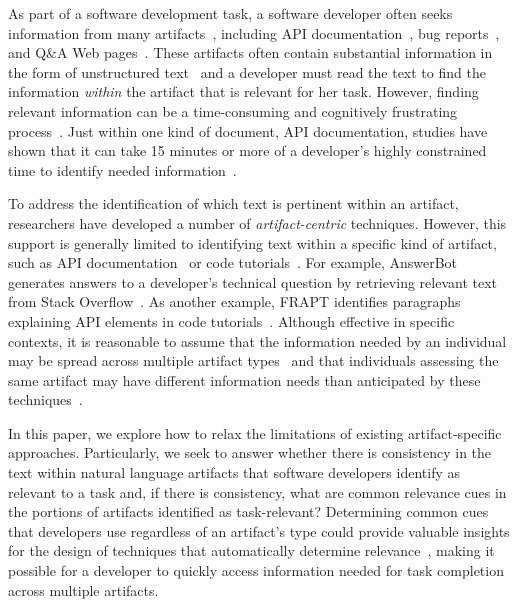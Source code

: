 
As part of a software development task, a software developer often
seeks information from many artifacts~\cite{Li2013}, including
API documentation~\cite{Singer1998, Robillard2011}, bug
reports~\cite{Breu2010, Ko2006}, and Q\&A Web
pages~\cite{umarji2008archetypal, Huang2018}.  These artifacts
often contain substantial information in the form of unstructured
text~\cite{Bavota2016} and a developer must read the text to find the
information \textit{within} the artifact that is relevant for her
task. However, finding relevant information can be a time-consuming
and cognitively frustrating process~\cite{Begel2008,
Robillard2011}.  Just within one kind of document, API
documentation, studies have shown that it can take 15 minutes or more
of a developer's highly constrained time to identify needed
information~\cite{endrikat2014, Meyer2017}.


To address the identification of which text is pertinent within an
artifact, researchers have developed a number of
\textit{artifact-centric} techniques.  However, this support is
generally limited to identifying text within a specific kind of
artifact, such as API documentation~\cite{Robillard2015, Xu2017} or
code tutorials~\cite{Jiang2016b, Jiang2017}.  For example, AnswerBot
generates answers to a developer's technical question by retrieving
relevant text from Stack Overflow~\cite{Xu2017}.
As another
example, FRAPT identifies
paragraphs explaining API elements in code tutorials~\cite{Jiang2017}.
Although effective in specific contexts, it is reasonable to assume
that the information needed by an individual may be spread across
multiple artifact types~\cite{Liu2019,Brandt2009a} and
that individuals assessing the same artifact may have different
information needs than anticipated by these techniques~\cite{Bavota2016, Walters2014}.



In this paper, we explore how to relax the limitations of existing
artifact-specific approaches. Particularly, we seek to answer whether
there is consistency in the text within natural language artifacts
that software developers identify as relevant to a task and, if there
is consistency, what are common relevance cues in the portions of
artifacts identified as task-relevant?  Determining common cues that
developers use regardless of an artifact's type
could provide valuable
insights for the design of techniques that automatically determine
relevance~\cite{Bavota2016, Walters2014},
making it possible for a
developer to quickly access information needed for task completion
across multiple artifacts.


